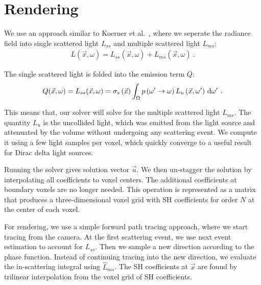 \section{Rendering}
\label{sec:rendering}

We use an approach similar to Koerner et al.~\cite{Koerner14}, where we seperate the radiance field into single scattered light $L_{ss}$ and multiple scattered light $L_{ms}$:
\begin{align}
L\left(\vec{x},\omega\right) = L_{ss}\left(\vec{x},\omega\right) + L_{ms}\left(\vec{x},\omega\right)
\ .
\end{align}

The single scattered light is folded into the emission term $Q$:
\begin{align}
Q(\vec{x}, \omega) = L_{ss}(\vec{x}, \omega) = \sigma_s\left(\vec{x}\right)\int_\Omega{ p\left(\omega'\rightarrow\omega\right) L_{u}\left(\vec{x}, \omega'\right)\,\mathrm{d}\omega' }
\ .
\end{align}

This means that, our solver will solve for the multiple scattered light $L_{ms}$. The quantity $L_u$ is the uncollided light, which was emitted from the light source and attenuated by the volume without undergoing any scattering event.
We compute it using a few light samples per voxel, which quickly converge to a useful result for Dirac delta light sources.

Running the solver gives solution vector $\vec{u}$. We then un-stagger the solution by interpolating all coefficients to voxel centers. The additional coefficients at boundary voxels are no longer needed. This operation is represented as a matrix that produces a three-dimensional voxel grid with SH coefficients for order $N$ at the center of each voxel.

For rendering, we use a simple forward path tracing approach, where we start tracing from the camera. At the first scattering event, we use next event estimation to account for $L_{ss}$. Then we sample a new direction according to the phase function. Instead of continuing tracing into the new direction, we evaluate the in-scattering integral using $\widehat{L}_{ms}$. The SH coefficients at $\vec{x}$ are found by trilinear interpolation from the voxel grid of SH coefficients.


